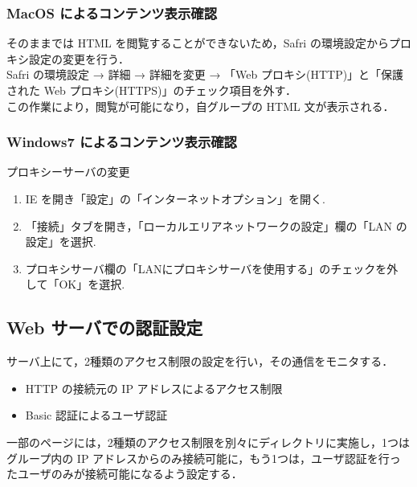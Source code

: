 \documentclass[a4j,titlepage]{jarticle}
\begin{document}
  \subsubsection{MacOS によるコンテンツ表示確認}
そのままでは HTML を閲覧することができないため，Safri の環境設定からプロキシ設定の変更を行う．\\
Safri の環境設定 → 詳細 → 詳細を変更 → 「Web プロキシ(HTTP)」と「保護された Web プロキシ(HTTPS)」のチェック項目を外す．\\
この作業により，閲覧が可能になり，自グループの HTML 文が表示される．


  \subsubsection{Windows7 によるコンテンツ表示確認}
  \item プロキシーサーバの変更
  \begin{enumerate}
\item IE を開き「設定」の「インターネットオプション」を開く.
\item 「接続」タブを開き，「ローカルエリアネットワークの設定」欄の「LAN の設定」を選択.
\item  プロキシサーバ欄の「LANにプロキシサーバを使用する」のチェックを外 して「OK」を選択.
  \end{enumerate}
  
  \subsection{Web サーバでの認証設定}
  サーバ上にて，2種類のアクセス制限の設定を行い，その通信をモニタする．\\
  \begin{itemize}
  \item HTTP の接続元の IP アドレスによるアクセス制限

  \item Basic 認証によるユーザ認証

  \end{itemize}
一部のページには，2種類のアクセス制限を別々にディレクトリに実施し，1つはグループ内の IP アドレスからのみ接続可能に，もう1つは，ユーザ認証を行ったユーザのみが接続可能になるよう設定する．
  
\end{document}
